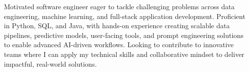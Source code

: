 

\begin{cvparagraph}

Motivated software engineer eager to tackle challenging problems across data engineering, machine learning, and full-stack application development. Proficient in Python, SQL, and Java, with hands-on experience creating scalable data pipelines, predictive models, user-facing tools, and prompt engineering solutions to enable advanced AI-driven workflows. Looking to contribute to innovative teams where I can apply my technical skills and collaborative mindset to deliver impactful, real-world solutions.
\end{cvparagraph}

